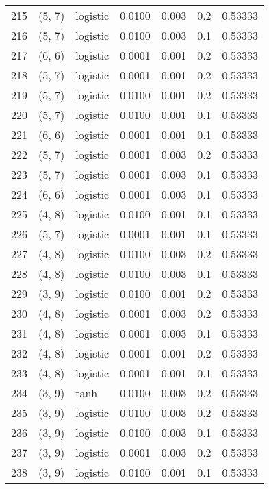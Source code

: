 \begin{tabular}{lllrrrr}
215 &      (5, 7) &  logistic &  0.0100 &  0.003 &  0.2 &   0.53333 \\
216 &      (5, 7) &  logistic &  0.0100 &  0.003 &  0.1 &   0.53333 \\
217 &      (6, 6) &  logistic &  0.0001 &  0.001 &  0.2 &   0.53333 \\
218 &      (5, 7) &  logistic &  0.0001 &  0.001 &  0.2 &   0.53333 \\
219 &      (5, 7) &  logistic &  0.0100 &  0.001 &  0.2 &   0.53333 \\
220 &      (5, 7) &  logistic &  0.0100 &  0.001 &  0.1 &   0.53333 \\
221 &      (6, 6) &  logistic &  0.0001 &  0.001 &  0.1 &   0.53333 \\
222 &      (5, 7) &  logistic &  0.0001 &  0.003 &  0.2 &   0.53333 \\
223 &      (5, 7) &  logistic &  0.0001 &  0.003 &  0.1 &   0.53333 \\
224 &      (6, 6) &  logistic &  0.0001 &  0.003 &  0.1 &   0.53333 \\
225 &      (4, 8) &  logistic &  0.0100 &  0.001 &  0.1 &   0.53333 \\
226 &      (5, 7) &  logistic &  0.0001 &  0.001 &  0.1 &   0.53333 \\
227 &      (4, 8) &  logistic &  0.0100 &  0.003 &  0.2 &   0.53333 \\
228 &      (4, 8) &  logistic &  0.0100 &  0.003 &  0.1 &   0.53333 \\
229 &      (3, 9) &  logistic &  0.0100 &  0.001 &  0.2 &   0.53333 \\
230 &      (4, 8) &  logistic &  0.0001 &  0.003 &  0.2 &   0.53333 \\
231 &      (4, 8) &  logistic &  0.0001 &  0.003 &  0.1 &   0.53333 \\
232 &      (4, 8) &  logistic &  0.0001 &  0.001 &  0.2 &   0.53333 \\
233 &      (4, 8) &  logistic &  0.0001 &  0.001 &  0.1 &   0.53333 \\
234 &      (3, 9) &      tanh &  0.0100 &  0.003 &  0.2 &   0.53333 \\
235 &      (3, 9) &  logistic &  0.0100 &  0.003 &  0.2 &   0.53333 \\
236 &      (3, 9) &  logistic &  0.0100 &  0.003 &  0.1 &   0.53333 \\
237 &      (3, 9) &  logistic &  0.0001 &  0.003 &  0.2 &   0.53333 \\
238 &      (3, 9) &  logistic &  0.0100 &  0.001 &  0.1 &   0.53333 \\

\end{tabular}
